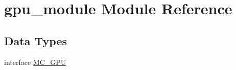 \hypertarget{namespacegpu__module}{}\section{gpu\+\_\+module Module Reference}
\label{namespacegpu__module}
\subsection*{Data Types}
\begin{DoxyCompactItemize}
\item 
interface \hyperlink{interfacegpu__module_1_1MC__GPU}{M\+C\+\_\+\+G\+PU}
\end{DoxyCompactItemize}
